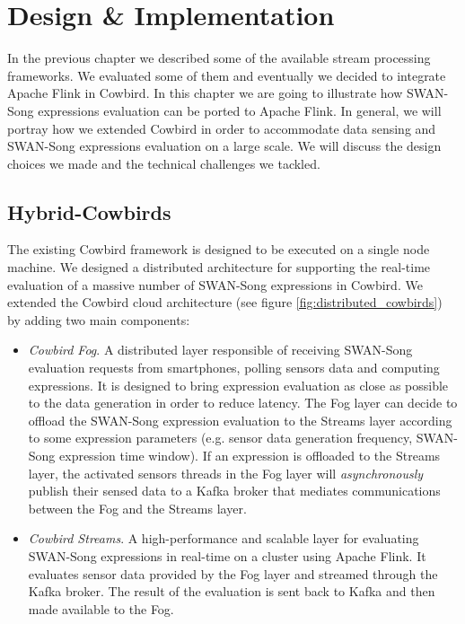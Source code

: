 \chapter{Design \& Implementation}
In the previous chapter we described some of the available stream processing frameworks. We evaluated some of them and eventually we decided to integrate Apache Flink in Cowbird. In this chapter we are going to illustrate how SWAN-Song expressions evaluation can be ported to Apache Flink. In general, we will portray how we extended Cowbird in order to accommodate data sensing and SWAN-Song expressions evaluation on a large scale. We will discuss the design choices we made and the technical challenges we tackled.  

\section{Hybrid-Cowbirds}
The existing Cowbird framework is designed to be executed on a single node machine. We designed a distributed architecture for supporting the real-time evaluation of a massive number of SWAN-Song expressions in Cowbird. We extended the Cowbird cloud architecture (see figure \ref{fig:distributed_cowbirds}) by adding two main components:
\begin{itemize}
\item \emph{Cowbird Fog}. A distributed layer responsible of receiving SWAN-Song evaluation requests from smartphones, polling sensors data and computing expressions. It is designed to bring expression evaluation as close as possible to the data generation in order to reduce latency. The Fog layer can decide to offload the SWAN-Song expression evaluation to the Streams layer according to some expression parameters (e.g. sensor data generation frequency, SWAN-Song expression time window). If an expression is offloaded to the Streams layer, the activated sensors threads in the Fog layer will \emph{asynchronously} publish their sensed data to a Kafka broker that mediates communications between the Fog and the Streams layer.
\item \emph{Cowbird Streams}. A high-performance and scalable layer for evaluating SWAN-Song expressions in real-time on a cluster using Apache Flink. It evaluates sensor data provided by the Fog layer and streamed through the Kafka broker. The result of the evaluation is sent back to Kafka and then made available to the Fog.
\end{itemize}

